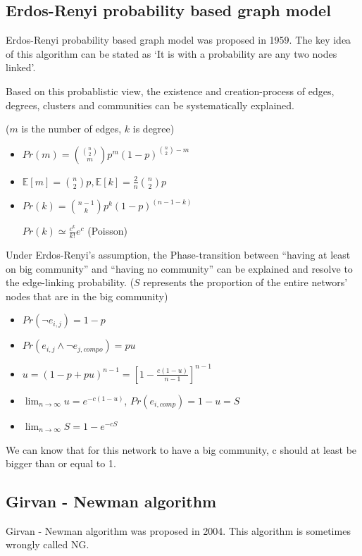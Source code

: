 \documentclass[UTF8, 11pt, a4paper]{ctexart}
\begin{document}
\subsection{Erdos-Renyi probability based graph model}

Erdos-Renyi probability based graph model was proposed in 1959. The key idea of this algorithm can be stated as `It is with a probability are any two nodes linked'.

Based on this probablistic view, the existence and creation-process of edges, degrees, clusters and communities can be systematically explained.

($m$ is the number of edges, $k$ is degree)
 
\begin{itemize}
\item $Pr(m)=\binom{\binom{n}{2}}{m} p^m (1-p)^{\binom{n}{2}-m}$
\item $\mathbb{E}[m]=\binom{n}{2}p,\mathbb{E}[k]=\frac{2}{n}\binom{n}{2}p$
\item $Pr(k)=\binom{n-1}{k}p^k(1-p)^{(n-1-k)}$

$Pr(k)\simeq \frac{c^k}{k!}e^c$ (Poisson)
\end{itemize}

Under Erdos-Renyi's assumption, the Phase-transition between ``having at least on big community'' and ``having no community'' can be explained and resolve to the edge-linking probability.
($S$ represents the proportion of the entire networs' nodes that are in the big community)
\begin{itemize}
\item $Pr(\neg e_{i,j})=1-p$
\item $Pr(e_{i,j} \land \neg e_{j,compo})=pu$
\item $u=(1-p+pu)^{n-1}=[1-\frac{c(1-u)}{n-1}]^{n-1}$
\item $\lim_{n \rightarrow \infty} u = e^{-c(1-u)}$, $Pr(e_{i,comp})=1-u=S$
\item $\lim_{n \rightarrow \infty} S = 1-e^{-cS}$
\end{itemize}

We can know that for this network to have a big community, c should at least be bigger than or equal to 1.

\subsection{Girvan - Newman algorithm}
Girvan - Newman algorithm was proposed in 2004. This algorithm is sometimes wrongly called NG.
\end{document}
